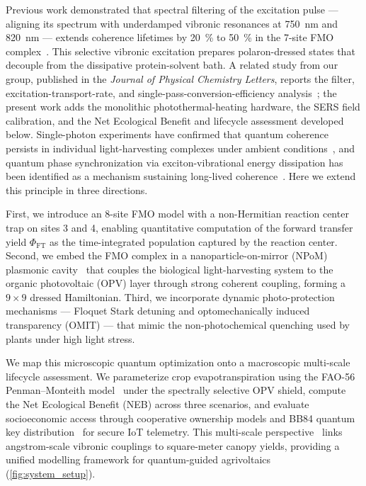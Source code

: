 \documentclass[preprint,12pt]{elsarticle}
\begin{document}
Previous work demonstrated that spectral filtering of the excitation pulse --- aligning its spectrum with underdamped vibronic resonances at \qty{750}{\nm} and \qty{820}{\nm} --- extends coherence lifetimes by \qty{20}{\percent} to \qty{50}{\percent} in the 7-site FMO complex~\cite{Kouam2026}.
This selective vibronic excitation prepares polaron-dressed states that decouple from the dissipative protein-solvent bath. A related study from our group, published in the \textit{Journal of Physical Chemistry Letters}, reports the filter, excitation-transport-rate, and single-pass-conversion-efficiency analysis~\cite{TeguiaKouam2026}; the present work adds the monolithic photothermal-heating hardware, the SERS field calibration, and the Net Ecological Benefit and lifecycle assessment developed below.
Single-photon experiments have confirmed that quantum coherence persists in individual light-harvesting complexes under ambient conditions~\cite{Li2023}, and quantum phase synchronization via exciton-vibrational energy dissipation has been identified as a mechanism sustaining long-lived coherence~\cite{Zhu2024}.
Here we extend this principle in three directions.

First, we introduce an 8-site FMO model with a non-Hermitian reaction center trap on sites 3 and 4, enabling quantitative computation of the forward transfer yield $\Phi_{\mathrm{FT}}$ as the time-integrated population captured by the reaction center.
Second, we embed the FMO complex in a nanoparticle-on-mirror (NPoM) plasmonic cavity~\cite{Chikkaraddy2016} that couples the biological light-harvesting system to the organic photovoltaic (OPV) layer through strong coherent coupling, forming a $9\times 9$ dressed Hamiltonian.
Third, we incorporate dynamic photo-protection mechanisms --- Floquet Stark detuning and optomechanically induced transparency (OMIT) --- that mimic the non-photochemical quenching used by plants under high light stress.

We map this microscopic quantum optimization onto a macroscopic multi-scale lifecycle assessment.
We parameterize crop evapotranspiration using the FAO-56 Penman--Monteith model~\cite{Allen1998} under the spectrally selective OPV shield, compute the Net Ecological Benefit (NEB) across three scenarios, and evaluate socioeconomic access through cooperative ownership models and BB84 quantum key distribution~\cite{Bennett1984} for secure IoT telemetry.
This multi-scale perspective~\cite{Vandamme2025} links angstrom-scale vibronic couplings to square-meter canopy yields, providing a unified modelling framework for quantum-guided agrivoltaics (\cref{fig:system_setup}).
\end{document}
